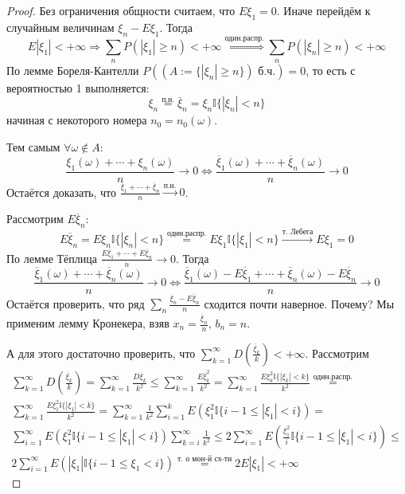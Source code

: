 \begin{proof}
	Без ограничения общности считаем, что $E\xi_1 = 0$. Иначе перейдём к случайным величинам $\xi_n - E\xi_1$. Тогда
	\[E|\xi_1| < +\infty \Rightarrow \sum_n P(|\xi_1| \geq n) < +\infty \stackrel{\text{один.распр.}}{\Leftrightarrow} \sum_n P(|\xi_n| \geq n) < +\infty\]
	По лемме Бореля-Кантелли $P((A:= \{|\xi_n| \geq n\}) \text{ б.ч.}) = 0$, то есть с вероятностью 1 выполняется:
	\[\xi_n \stackrel{\text{п.н.}}{=} \overline{\xi}_n = \xi_n\mathbb{I}\{|\xi_n| < n\}\]
	начиная с некоторого номера $n_0 = n_0(\omega)$.

	Тем самым $\forall \omega \not\in A$:
	\[\frac{\xi_1(\omega) + \cdots + \xi_n(\omega)}{n} \to 0 \Leftrightarrow \frac{\overline{\xi}_1(\omega) + \cdots + \overline{\xi}_n(\omega)}{n} \to 0\]
	Остаётся доказать, что $\frac{\overline{\xi}_1 + \cdots + \overline{\xi}_n}{n} \stackrel{\text{п.н.}}{\to} 0$.

	Рассмотрим $E\overline{\xi}_n$:
	\[E\overline{\xi}_n = E\xi_n\mathbb{I}\{|\xi_n| < n\} \stackrel{\text{один.распр.}}{=} E\xi_1\mathbb{I}\{|\xi_1| < n\} \stackrel{\text{т. Лебега}}{\to} E\xi_1 = 0\]
	По лемме Тёплица $\frac{E\overline{\xi}_1 + \cdots + E\overline{\xi}_n}{n} \to 0$. Тогда
	\[\frac{\overline{\xi}_1(\omega) + \cdots + \overline{\xi}_n(\omega)}{n} \to 0 \Leftrightarrow \frac{\overline{\xi}_1(\omega) - E\overline{\xi}_1 + \cdots + \overline{\xi}_n(\omega) - E\overline{\xi}_n}{n} \to 0\]
	Остаётся проверить, что ряд $\sum_n \frac{\overline{\xi}_n - E\overline{\xi}_n}{n}$ сходится почти наверное. Почему? Мы применим лемму Кронекера, взяв $x_n = \frac{\overline{\xi}_n}{n},\, b_n = n$.

	А для этого достаточно проверить, что $\sum_{k = 1}^\infty D\left(\frac{\overline{\xi}_k}{k}\right) < +\infty$. Рассмотрим
	\begin{align*}
		\sum_{k = 1}^\infty D\left(\frac{\overline{\xi}_k}{k}\right) = \sum_{k = 1}^\infty \frac{D\overline{\xi}_k}{k^2} \leq \sum_{k = 1}^\infty \frac{E\overline{\xi}_k^2}{k^2} = \sum_{k = 1}^\infty \frac{E\xi_k^2\mathbb{I}\{|\xi_k| < k\}}{k^2} \stackrel{\text{один.распр.}}{=} \\
		\sum_{k = 1}^\infty \frac{E\xi_1^2\mathbb{I}\{|\xi_1| < k\}}{k^2} = \sum_{k = 1}^\infty \frac{1}{k^2}\sum_{i = 1}^k E\left(\xi_1^2\mathbb{I}\{i - 1 \leq |\xi_1| < i\}\right) =                                                                                                \\
		\sum_{i = 1}^\infty E\left(\xi_1^2\mathbb{I}\{i - 1 \leq |\xi_1| < i\}\right) \sum_{k = i}^\infty \frac{1}{k^2} \leq 2\sum_{i = 1}^\infty E\left(\frac{\xi_1^2}{i}\mathbb{I}\{i - 1 \leq |\xi_1| < i\}\right) \leq                                                             \\
		2 \sum_{i = 1}^\infty E(|\xi_1|\mathbb{I}\{i - 1 \leq \xi_1 < i\}) \stackrel{\text{т. о мон-й сх-ти}}{=} 2E|\xi_1| < +\infty
	\end{align*}
\end{proof}


